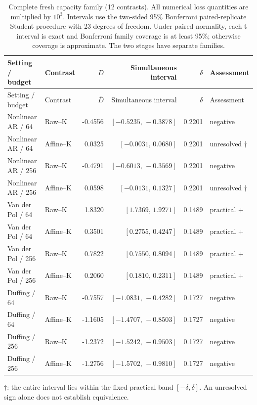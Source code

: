 \clearpage
\begingroup\small\setlength{\tabcolsep}{3pt}
\begin{longtable}{llrrrl}
\caption{Complete fresh capacity family (12 contrasts). All numerical loss quantities are multiplied by $10^3$. Intervals use the two-sided 95\% Bonferroni paired-replicate Student procedure with 23 degrees of freedom. Under paired normality, each t interval is exact and Bonferroni family coverage is at least 95\%; otherwise coverage is approximate. The two stages have separate families.}\label{c:tab:all-capacity}\\
\toprule
Setting / budget & Contrast & $\overline D$ & Simultaneous interval & $\delta$ & Assessment \\
\midrule
\endfirsthead
\toprule
Setting / budget & Contrast & $\overline D$ & Simultaneous interval & $\delta$ & Assessment \\
\midrule
\endhead
\bottomrule\endfoot
Nonlinear AR / 64 & Raw--K & -0.4556 & $[-0.5235,\,-0.3878]$ & 0.2201 & negative \\
Nonlinear AR / 64 & Affine--K & 0.0325 & $[-0.0031,\,0.0680]$ & 0.2201 & unresolved $\dagger$ \\
Nonlinear AR / 256 & Raw--K & -0.4791 & $[-0.6013,\,-0.3569]$ & 0.2201 & negative \\
Nonlinear AR / 256 & Affine--K & 0.0598 & $[-0.0131,\,0.1327]$ & 0.2201 & unresolved $\dagger$ \\
Van der Pol / 64 & Raw--K & 1.8320 & $[1.7369,\,1.9271]$ & 0.1489 & practical + \\
Van der Pol / 64 & Affine--K & 0.3501 & $[0.2755,\,0.4247]$ & 0.1489 & practical + \\
Van der Pol / 256 & Raw--K & 0.7822 & $[0.7550,\,0.8094]$ & 0.1489 & practical + \\
Van der Pol / 256 & Affine--K & 0.2060 & $[0.1810,\,0.2311]$ & 0.1489 & practical + \\
Duffing / 64 & Raw--K & -0.7557 & $[-1.0831,\,-0.4282]$ & 0.1727 & negative \\
Duffing / 64 & Affine--K & -1.1605 & $[-1.4707,\,-0.8503]$ & 0.1727 & negative \\
Duffing / 256 & Raw--K & -1.2372 & $[-1.5242,\,-0.9503]$ & 0.1727 & negative \\
Duffing / 256 & Affine--K & -1.2756 & $[-1.5702,\,-0.9810]$ & 0.1727 & negative \\
\end{longtable}
\noindent $\dagger$: the entire interval lies within the fixed practical band $[-\delta,\delta]$. An unresolved sign alone does not establish equivalence.
\endgroup

